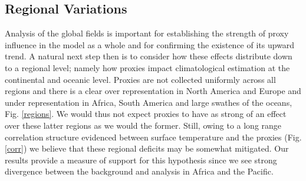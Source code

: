 \documentclass[12pt]{article}
\begin{document}


\subsection{Regional Variations} \label{regional}
Analysis of the global fields is important for establishing the strength of proxy influence in the model as a whole and for confirming the existence of its upward trend. A natural next step then is to consider how these effects distribute down to a regional level; namely how proxies impact climatological estimation at the continental and oceanic level. Proxies are not collected uniformly across all regions and there is a clear over representation in North America and Europe and under representation in Africa, South America and large swathes of the oceans, Fig. \ref{regions}. We would thus not expect proxies to have as strong of an effect over these latter regions as we would the former. Still, owing to a long range correlation structure evidenced between surface temperature and the proxies (Fig. \ref{corr}) we believe that these regional deficits may be somewhat mitigated. Our results provide a measure of support for this hypothesis since we see strong divergence between the background and analysis in Africa and the Pacific.
\end{document}
